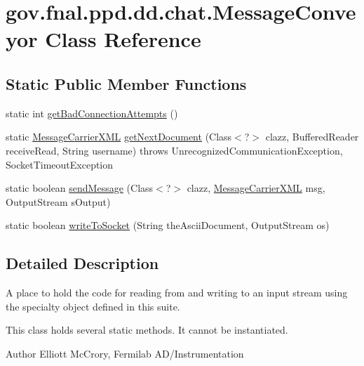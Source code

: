 \hypertarget{classgov_1_1fnal_1_1ppd_1_1dd_1_1chat_1_1MessageConveyor}{\section{gov.\-fnal.\-ppd.\-dd.\-chat.\-Message\-Conveyor Class Reference}
\label{classgov_1_1fnal_1_1ppd_1_1dd_1_1chat_1_1MessageConveyor}
}
\subsection*{Static Public Member Functions}
\begin{DoxyCompactItemize}
\item 
static int \hyperlink{classgov_1_1fnal_1_1ppd_1_1dd_1_1chat_1_1MessageConveyor_aebb7c15f246ede2ca14fc803978c7b7e}{get\-Bad\-Connection\-Attempts} ()
\item 
static \hyperlink{classgov_1_1fnal_1_1ppd_1_1dd_1_1xml_1_1MessageCarrierXML}{Message\-Carrier\-X\-M\-L} \hyperlink{classgov_1_1fnal_1_1ppd_1_1dd_1_1chat_1_1MessageConveyor_ae56d91de80414057b1d55c555a188194}{get\-Next\-Document} (Class$<$?$>$ clazz, Buffered\-Reader receive\-Read, String username)  throws Unrecognized\-Communication\-Exception, Socket\-Timeout\-Exception 
\item 
static boolean \hyperlink{classgov_1_1fnal_1_1ppd_1_1dd_1_1chat_1_1MessageConveyor_ad75f4183546edf67ecc120cd4a763f5b}{send\-Message} (Class$<$?$>$ clazz, \hyperlink{classgov_1_1fnal_1_1ppd_1_1dd_1_1xml_1_1MessageCarrierXML}{Message\-Carrier\-X\-M\-L} msg, Output\-Stream s\-Output)
\item 
static boolean \hyperlink{classgov_1_1fnal_1_1ppd_1_1dd_1_1chat_1_1MessageConveyor_a3f948d3a9e2544f6ccd6fa371d1db792}{write\-To\-Socket} (String the\-Ascii\-Document, Output\-Stream os)
\end{DoxyCompactItemize}


\subsection{Detailed Description}
A place to hold the code for reading from and writing to an input stream using the specialty object defined in this suite.

This class holds several static methods. It cannot be instantiated.

\begin{DoxyAuthor}{Author}
Elliott Mc\-Crory, Fermilab A\-D/\-Instrumentation 
\end{DoxyAuthor}


